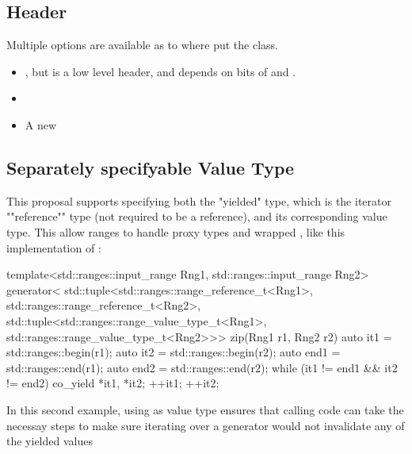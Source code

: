 \documentclass{wg21}
\begin{document}
\subsection{Header}

Multiple options are available as to where put the  class.

\begin{itemize}
    \item {}, but  is a low level header, and  depends on bits of  and .

    \item {}

    \item A new 

\end{itemize}

\subsection{Separately specifyable Value Type}

This proposal supports specifying both the "yielded" type, which is the iterator ""reference"" type (not required to be a reference), and its corresponding value type.
This allow ranges to handle proxy types and wrapped , like this implementation of :

\begin{colorblock}
    template<std::ranges::input_range Rng1,
    std::ranges::input_range Rng2>
    generator<
    std::tuple<std::ranges::range_reference_t<Rng1>,
    std::ranges::range_reference_t<Rng2>,
    std::tuple<std::ranges::range_value_type_t<Rng1>,
    std::ranges::range_value_type_t<Rng2>>>
    zip(Rng1 r1, Rng2 r2) {
        auto it1 = std::ranges::begin(r1);
        auto it2 = std::ranges::begin(r2);
        auto end1 = std::ranges::end(r1);
        auto end2 = std::ranges::end(r2);
        while (it1 != end1 && it2 != end2) {
            co_yield {*it1, *it2};
            ++it1; ++it2;
        }
    }
\end{colorblock}

In this second example, using  as value type ensures that calling code can take the necessay steps
to make sure iterating over a generator would not invalidate any of the yielded values
\end{document}
